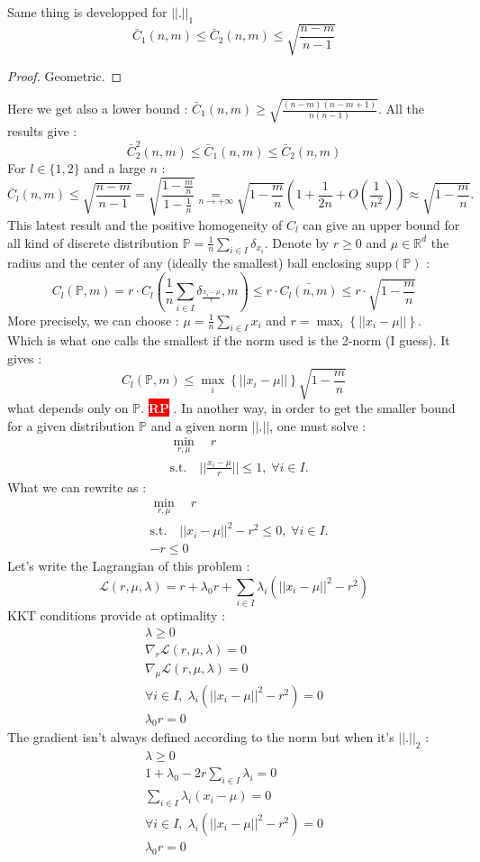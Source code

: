 \documentclass{amsart}
\newcommand{\nb}[3]{
		{\colorbox{#2}{\bfseries\sffamily\tiny\textcolor{white}{#1}}}
		{\textcolor{#2}{\text{$\blacktriangleright$}{\textcolor{#2}{#3}}\text{$\blacktriangleleft$}}}}
\newcommand{\rp}[1]{\nb{RP}{red}{#1}}
\begin{document}
Same thing is developped for $||.||_1$
$$
\bar{C}_1(n,m)\leq\bar{C}_2(n,m) \leq\sqrt{\frac{n-m}{n-1}}
$$
\begin{proof}
    Geometric.
\end{proof}
Here we get also a lower bound : $\bar{C}_1(n,m)\geq\sqrt{\frac{(n-m)(n-m+1)}{n(n-1)}}$.
All the results give : $$\bar{C}_2^2(n,m)\leq \bar{C}_1(n,m)\leq\bar{C}_2(n,m)$$
\newline
For $l\in\{1,2\}$ and a large $n$ : $$\bar{C}_l(n,m)\leq \sqrt{\frac{n-m}{n-1}}=\sqrt{\frac{1-\frac{m}{n}}{1-\frac{1}{n}}}\underset{n \to +\infty}{=}\sqrt{1-\frac{m}{n}}(1+\frac{1}{2n}+O(\frac{1}{n^2}))\approx \sqrt{1-\frac{m}{n}}.$$
This latest result and the positive homogeneity of $C_l$ can give an upper bound for all kind of discrete distribution $\mathbb{P}=\frac{1}{n}\sum_{i\in I}\delta_{x_i}$. Denote by $r\geq 0$ and $\mu\in\mathbb{R}^d$ the radius and the center of any  (ideally the smallest) ball enclosing $\text{supp}(\mathbb{P})$ :
$$
C_l(\mathbb{P},m)=r\cdot C_l(\frac{1}{n}\sum_{i\in I}\delta_{\frac{x_i-\mu}{r}},m)\leq r\cdot \bar{C_l(n,m)}\leq r\cdot \sqrt{1-\frac{m}{n}}
$$
More precisely, we can choose : $\mu=\frac{1}{n}\sum_{i\in I}x_i$ and $r=\max_i\left\{{||x_i-\mu||}\right\}$. Which is what one calls the smallest if the norm used is the 2-norm (I guess). It gives : 
$$
C_l(\mathbb{P},m)\leq \max_i\left\{{||x_i-\mu||}\right\}\sqrt{1-\frac{m}{n}}
$$
what depends only on $\mathbb{P}$. \rp{maybe that helps a very little the article}. In another way, in order to get the smaller bound for a given distribution $\mathbb{P}$ and a given norm $||.||$, one must solve : 
\begin{align*}
    &\min_{r,\mu} \quad r\\
    &\text{s.t.}\quad ||\frac{x_i-\mu}{r}|| \leq 1, \;\forall i\in I.
\end{align*}
What we can rewrite as : 
\begin{align*}
    &\min_{r,\mu} \quad r\\
    &\text{s.t.}\quad ||x_i-\mu||^2-r^2 \leq 0, \;\forall i\in I.\\
    &-r\leq0
\end{align*}
Let's write the Lagrangian of this problem : 
$$
\mathcal{L}(r,\mu,\lambda)=r+\lambda_0r+\sum_{i\in I}\lambda_i(||x_i-\mu||^2-r^2)
$$
KKT conditions provide at optimality : \begin{align*}
    \lambda\geq0\\
    \nabla_r\mathcal{L}(r,\mu,\lambda)=0\\
    \nabla_\mu\mathcal{L}(r,\mu,\lambda)=0\\
    \forall i\in I,\;\lambda_i(||x_i-\mu||^2-r^2)=0 \\
    \lambda_0r=0
\end{align*}
The gradient isn't always defined according to the norm but when it's $||.||_2$ : 
\begin{align*}
    \lambda\geq0\\
    1+\lambda_0-2r\sum_{i\in I}\lambda_i=0\\
    \sum_{i\in I}\lambda_i(x_i-\mu)=0\\
    \forall i\in I,\;\lambda_i(||x_i-\mu||^2-r^2)=0 \\
    \lambda_0r=0
\end{align*}
\end{document}
